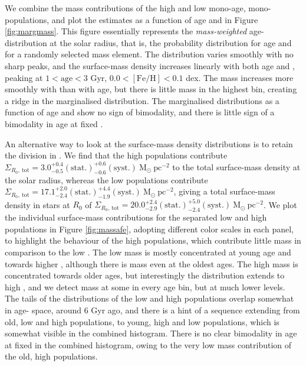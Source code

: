 We combine the mass contributions of the high and low \afe{} mono-age, mono-\feh{} populations, and plot the estimates as a function of age and \feh{} in Figure \ref{fig:margmass}. This figure essentially represents the \emph{mass-weighted} age-\feh{} distribution at the solar radius, that is, the probability distribution for age and \feh{} for a randomly selected mass element. The distribution varies smoothly with no sharp peaks, and the surface-mass density increases linearly with both age and \feh{}, peaking at $1 < \mathrm{age} < 3$ Gyr, $0.0 < \mathrm{[Fe/H]} < 0.1$ dex. The mass increases more smoothly with \feh{} than with age, but there is little mass in the highest \feh{} bin, creating a ridge in the marginalised distribution. The marginalised distributions as a function of age and \feh{} show no sign of bimodality, and there is little sign of a bimodality in age at fixed \feh{}. 

An alternative way to look at the surface-mass density distributions is to retain the division in \afe{}. We find that the high \afe{} populations contribute $\Sigma_{R_0,\ \mathrm{tot}} = 3.0_{-0.5}^{+0.4}\mathrm{(stat.)}_{-0.6}^{+0.6}\mathrm{(syst.)}\ \mathrm{M_{\odot}\ pc^{-2}}$ to the total surface-mass density at the solar radius, whereas the low \afe{} populations contribute $\Sigma_{R_0,\ \mathrm{tot}} = 17.1_{-2.4}^{+2.0}\mathrm{(stat.)}_{-1.9}^{+4.4}\mathrm{(syst.)}\ \mathrm{M_{\odot}\ pc^{-2}}$, giving a total surface-mass density in stars at $R_0$ of $\Sigma_{R_0,\ \mathrm{tot}} = 20.0_{-2.9}^{+2.4}\mathrm{(stat.)}_{-2.4}^{+5.0}\mathrm{(syst.)}\ \mathrm{M_{\odot}\ pc^{-2}}$. We plot the individual surface-mass contributions for the separated low and high \afe{} populations in Figure \ref{fig:massafe}, adopting different color scales in each panel, to highlight the behaviour of the high \afe{} populations, which contribute little mass in comparison to the low \afe{}. The low \afe{} mass is mostly concentrated at young age and towards higher \feh{}, although there is mass even at the oldest ages. The high \afe{} mass is concentrated towards older ages, but interestingly the distribution extends to high \feh{}, and we detect mass at some \feh{} in every age bin, but at much lower levels. The tails of the distributions of the low and high \afe{} populations overlap somewhat in age-\feh{} space, around 6 Gyr ago, and there is a hint of a sequence extending from old, low \feh{} and high \afe{} populations, to young, high \feh{} and low \afe{} populations, which is somewhat visible in the combined histogram. There is no clear bimodality in age at fixed \feh{} in the combined histogram, owing to the very low mass contribution of the old, high \afe{} populations. 

